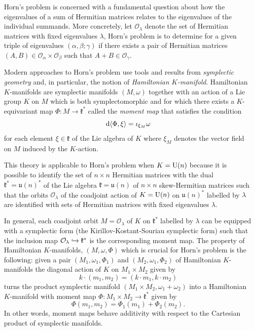 \documentclass[notitlepage]{article}
\begin{document}
Horn's problem is concerned with a fundamental question about how the eigenvalues of a sum of Hermitian matrices relates to the eigenvalues of the individual summands.
More concretely, let $\mathcal O_{\lambda}$ denote the set of Hermitian matrices with fixed eigenvalues $\lambda$, Horn's problem is to determine for a given triple of eigenvalues $(\alpha, \beta; \gamma)$ if there exists a pair of Hermitian matrices $(A, B) \in \mathcal O_{\alpha} \times \mathcal O_{\beta}$ such that $A+B \in \mathcal O_{\gamma}$.

Modern approaches to Horn's problem use tools and results from \textit{symplectic geometry} and, in particular, the notion of \textit{Hamiltonian $K$-manifold}.
Hamiltonian $K$-manifolds are symplectic manifolds $(M, \omega)$ together with an action of a Lie group $K$ on $M$ which is both symplectomorphic and for which there exists a $K$-equivariant map $\Phi : M \to \mathfrak k^{*}$ called the \textit{moment map} that satisfies the condition
\begin{equation}
    \mathrm{d} \langle\Phi,\xi\rangle = \iota_{\xi_M}\omega
\end{equation}
for each element $\xi \in \mathfrak k$ of the Lie algebra of $K$ where $\xi_{M}$ denotes the vector field on $M$ induced by the $K$-action.

This theory is applicable to Horn's problem when $K = \operatorname{U}(n)$ because it is possible to identify the set of $n\times n$ Hermitian matrices with the dual $\mathfrak k^{*} = \mathfrak u(n)^{*}$ of the Lie algebra $\mathfrak k = \mathfrak u(n)$ of $n\times n$ skew-Hermitian matrices such that the orbits $\mathcal O_{\lambda}$ of the coadjoint action of $K=\operatorname{U}(n)$ on $\mathfrak u(n)^{*}$ labelled by $\lambda$ are identified with sets of Hermitian matrices with fixed eigenvalues $\lambda$.

In general, each coadjoint orbit $M = \mathcal O_{\lambda}$ of $K$ on $\mathfrak k^{*}$ labelled by $\lambda$ can be equipped with a symplectic form (the Kirillov-Kostant-Souriau symplectic form) such that the inclusion map $\mathcal O_{\lambda} \xhookrightarrow{} \mathfrak k^{*}$ is the corresponding moment map.
The property of Hamiltonian $K$-manifolds, $(M, \omega, \Phi)$ which is crucial for Horn's problem is the following: given a pair $(M_1, \omega_1, \Phi_1)$ and $(M_2, \omega_1, \Phi_2)$ of Hamiltonian $K$-manifolds the diagonal action of $K$ on $M_1 \times M_2$ given by
\begin{equation}
    k \cdot (m_1, m_2) = (k \cdot m_1, k \cdot m_2)
\end{equation}
turns the product symplectic manifold $(M_1 \times M_2, \omega_1 + \omega_2)$ into a Hamiltonian $K$-manifold with moment map $\Phi : M_1 \times M_2 \to \mathfrak k^{*}$ given by
\begin{equation}
    \Phi(m_1,m_2) = \Phi_1(m_1) + \Phi_2(m_2).
\end{equation}
In other words, moment maps behave additivity with respect to the Cartesian product of symplectic manifolds.
\end{document}
